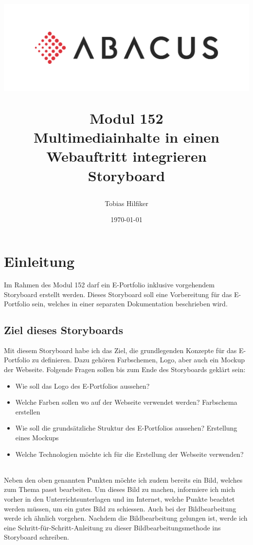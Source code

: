 \documentclass[11pt]{article}
\title{
    \includegraphics{media/frontpage}
    \begin{center}
        Modul 152 \\
        Multimediainhalte in einen Webauftritt integrieren\\
        Storyboard
    \end{center}}
\author{Tobias Hilfiker}
\date{\today}
\begin{document}
    \begin{titlingpage}
        \maketitle
    \end{titlingpage}
    \pagebreak

    \tableofcontents
    \pagebreak

    \section{Einleitung}
    Im Rahmen des Modul 152 darf ein E-Portfolio inklusive vorgehendem Storyboard erstellt werden.
    Dieses Storyboard soll eine Vorbereitung für das E-Portfolio sein, welches in einer separaten
    Dokumentation beschrieben wird.

    \subsection{Ziel dieses Storyboards}
    Mit diesem Storyboard habe ich das Ziel, die grundlegenden Konzepte für das E-Portfolio zu definieren.
    Dazu gehören Farbschemen, Logo, aber auch ein Mockup der Webseite.
    Folgende Fragen sollen bis zum Ende des Storyboards geklärt sein:
    \begin{itemize}
        \item Wie soll das Logo des E-Portfolios aussehen?
        \item Welche Farben sollen wo auf der Webseite verwendet werden? \textrightarrow Farbschema erstellen
        \item Wie soll die grundsätzliche Struktur des E-Portfolios aussehen?
        \textrightarrow Erstellung eines Mockups
        \item Welche Technologien möchte ich für die Erstellung der Webseite verwenden?
    \end{itemize}
    \\
    Neben den oben genannten Punkten möchte ich zudem bereits ein Bild, welches zum Thema passt bearbeiten.
    Um dieses Bild zu machen, informiere ich mich vorher in den Unterrichtsunterlagen und im Internet, welche
    Punkte beachtet werden müssen, um ein gutes Bild zu schiessen.
    Auch bei der Bildbearbeitung werde ich ähnlich vorgehen. Nachdem die Bildbearbeitung gelungen ist, werde
    ich eine Schritt-für-Schritt-Anleitung zu dieser Bildbearbeitungsmethode ins Storyboard schreiben.
\end{document}
